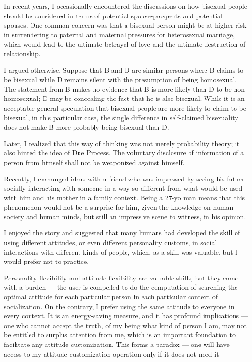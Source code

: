 
In recent years, I occasionally encountered the discussions on how bisexual people should be considered
in terms of potential spouse-prospects and potential spouses.
One common concern was that a bisexual person might be at higher risk in
surrendering to paternal and maternal pressures for heterosexual marriage,
which would lead to the ultimate betrayal of love and the ultimate destruction of relationship.

I argued otherwise.
Suppose that B and D are similar persons where B claims to be bisexual while D remains silent with the presumption of being homosexual.
The statement from B makes no evidence that B is more likely than D to be non-homosexual;
D may be concealing the fact that he is also bisexual.
While it is an acceptable general speculation that bisexual people are more likely to claim to be bisexual,
in this particular case, the single difference in self-claimed bisexuality does not make B more probably being bisexual than D.

Later, I realized that this way of thinking was not merely probability theory; it also hinted the idea of Due Process.
The voluntary disclosure of information of a person from himself shall not be weaponized against himself.

Recently, I exchanged ideas with a friend who was impressed by seeing his father socially interacting with someone
in a way so different from what would be used with him and his mother in a family context.
Being a 27-yo man means that this phenomenon would not be a surprise for him,
given the knowledge on human society and human minds, but still an impressive scene to witness, in his opinion.

I enjoyed the story and suggested that many humans had developed the skill of using different attitudes,
or even different personality customs, in social interactions with different kinds of people,
which, as a skill was valuable, but I would prefer not to practice.

Personality flexibility and attitude flexibility are valuable skills, but they come with a burden ---
the user is compelled to do the computation of searching the optimal attitude
for each particular person in each particular context of socialization.
On the contrary, I prefer using the same attitude to everyone in every context.
It is an energy-saving measure, and it has profound implications ---
one who cannot accept the truth, of my being what kind of person I am, may not be entitled to surplus attention from me,
which is an important foundation to facilitate any attitude customization.
This forms a paradox --- one will have access to my attitude customization operation only if it does not need it.

